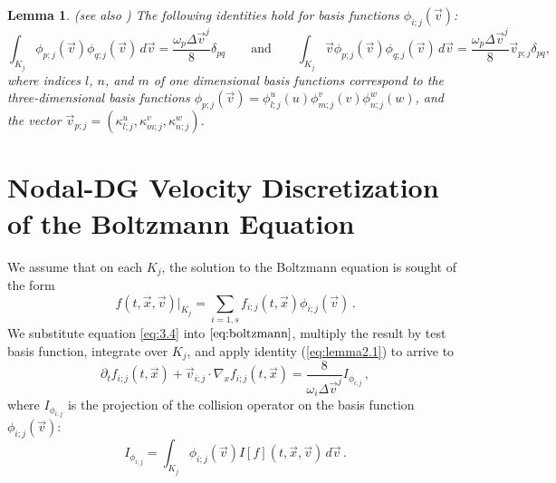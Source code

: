 \documentclass[12pt]{CSUNthesis}
\newtheorem{lemma}{Lemma}
\begin{document}
\begin{lemma} (see also \cite{AlekseenkoJosyula2012a, HesthavenWarburtoin2007})
The following identities hold for basis functions $\phi_{i;j}(\vec{v})$:
\begin{equation}
\label{eq:lemma2.1} 
\int_{K_{j}} \phi_{p;j}(\vec{v})\phi_{q;j}(\vec{v})\, d\vec{v} = \frac{\omega_{p}\Delta\vec{v}^{j}}{8}\delta_{pq}
\qquad\mbox{and} \qquad
\int_{K_{j}} \vec{v}\phi_{p;j}(\vec{v})\phi_{q;j}(\vec{v})\, d\vec{v} 
= \frac{\omega_{p}\Delta\vec{v}^{j}}{8}\vec{v}_{p;j}\delta_{pq},
\end{equation}
where indices $l$, $n$, and $m$ of one dimensional basis functions correspond to 
the three-dimensional basis functions 
$\phi_{p;j}(\vec{v})=
\phi^{u}_{l;j}(u)\phi^{v}_{m;j}(v)\phi^{w}_{n;j}(w)$, 
and the vector $\vec{v}_{p;j}=(\kappa^{u}_{l;j},\kappa^{v}_{m;j},\kappa^{w}_{n;j})$. 
\end{lemma}
\section{Nodal-DG Velocity Discretization of the Boltzmann Equation}
We assume that on each $K_j$, the solution to the Boltzmann equation is sought of the form 
\begin{equation}
\label{eq:3.4}
f(t,\vec{x},\vec{v})|_{K_{j}} = \sum_{i=1,s} f_{i;j}(t,\vec{x})\phi_{i;j}(\vec{v})\, .
\end{equation}
We substitute equation \ref{eq:3.4} into $\ref{eq:boltzmann}$, multiply the result by test basis function, integrate over $K_j$, and apply identity (\ref{eq:lemma2.1}) to arrive to
\begin{equation}
\label{discveloblzm}
\partial_{t} f_{i;j}(t,\vec{x}) + \vec{v}_{i;j}\cdot \nabla_{x} f_{i;j}(t,\vec{x}) =
\frac{8}{\omega_{i}\Delta\vec{v}^{j}}I_{\phi_{i;j}}\, ,
\end{equation}
where $I_{\phi_{i;j}}$ is the projection of the collision operator 
on the basis function $\phi_{i;j}(\vec{v})$:
\begin{equation}
\label{eq:projcoll}
I_{\phi_{i;j}} = \int_{K_{j}}\phi_{i;j}(\vec{v}) I[f](t,\vec{x},\vec{v})\, d\vec{v}\, .
\end{equation} 
\end{document}
